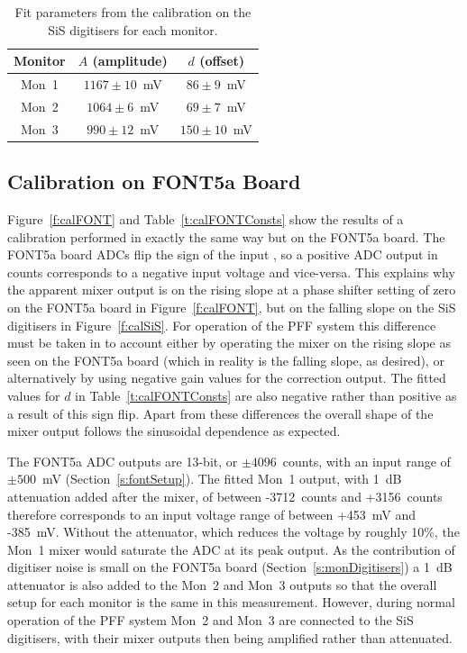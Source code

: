 \begin{table}
  \begin{center}
    \begin{tabular}{|c c c|}
	   \hline
       Monitor & \(A\) (amplitude) & \(d\) (offset) \\ \hline
       Mon~1 & \(1167\pm10\)~mV & \(86\pm9\)~mV \\ 
       Mon~2 & \(1064\pm6\)~mV & \(69\pm7\)~mV\\
       Mon~3 & \(990\pm12\)~mV & \(150\pm10\)~mV\\ \hline
    \end{tabular}
    \caption{Fit parameters from the calibration on the SiS digitisers for each monitor.}
  	\label{t:calSiSConsts}
  \end{center}
\end{table}

\subsection{Calibration on FONT5a Board}
\label{ss:FONTCal}

Figure~\ref{f:calFONT} and Table~\ref{t:calFONTConsts} show the results of a calibration performed in exactly the same way but on the FONT5a board. The FONT5a board ADCs flip the sign of the input \cite{glennPriv}, so a positive ADC output in counts corresponds to a negative input voltage and vice-versa. This explains why the apparent mixer output is on the rising slope at a phase shifter setting of zero on the FONT5a board in Figure~\ref{f:calFONT}, but on the falling slope on the SiS digitisers in Figure~\ref{f:calSiS}. For operation of the PFF system this difference must be taken in to account either by operating the mixer on the rising slope as seen on the FONT5a board (which in reality is the falling slope, as desired), or alternatively by using negative gain values for the correction output. The fitted values for \(d\) in Table~\ref{t:calFONTConsts} are also negative rather than positive as a result of this sign flip. Apart from these differences the overall shape of the mixer output follows the sinusoidal dependence as expected.

The FONT5a ADC outputs are 13-bit, or \(\pm4096\)~counts, with an input range of \(\pm500\)~mV (Section~\ref{s:fontSetup}). The fitted Mon~1 output, with 1~dB attenuation added after the mixer, of between -3712~counts and +3156~counts therefore corresponds to an input voltage range of between +453~mV and -385~mV. Without the attenuator, which reduces the voltage by roughly 10\%, the Mon~1 mixer would saturate the ADC at its peak output. As the contribution of digitiser noise is small on the FONT5a board (Section~\ref{s:monDigitisers}) a 1~dB attenuator is also added to the Mon~2 and Mon~3 outputs so that the overall setup for each monitor is the same in this measurement. However, during normal operation of the PFF system Mon~2 and Mon~3 are connected to the SiS digitisers, with their mixer outputs then being amplified rather than attenuated.

